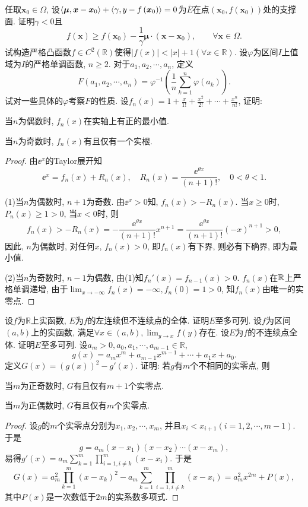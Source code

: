 \begin{quizb}
任取\(\boldsymbol{x}_0\in\varOmega\), 设\(\langle \boldsymbol{\mu},\boldsymbol{x}-\boldsymbol{x}_0 \rangle+\langle \gamma,y-f\left(\boldsymbol{x}_0\right) \rangle=0\)为\(\overline{E}\)在点\((\boldsymbol{x}_0,f\left(\boldsymbol{x}_0\right))\)处的支撑面. 证明\(\gamma<0\)且\[f\left(\boldsymbol{x}\right)\geqslant f\left(\boldsymbol{x}_0\right)-\frac{1}{\gamma}\boldsymbol{\mu}\cdot\left(\boldsymbol{x}-\boldsymbol{x}_0\right),\qquad\forall\boldsymbol{x}\in\varOmega.\]
\woe 试构造严格凸函数\(f\in C^2(\mathbb{R})\)使得\(\left|f(x)\right|<|x|+1\left(\forall x\in\mathbb{R}\right)\).
\woe 设\(\varphi\)为区间\(I\)上值域为\(I\)的严格单调函数, \(n\geqslant 2\). 对于\(a_1,a_2,\cdots,a_n\), 定义\[F(a_1,a_2,\cdots,a_n)=\varphi^{-1}\left(\frac{1}{n}\sum_{k=1}^{n}\varphi(a_k)\right).\]试对一些具体的\(\varphi\)考察\(F\)的性质.
\woe 设\(f_n(x)=1+\frac{x}{1!}+\frac{x^2}{2!}+\cdots+\frac{x^n}{n!}\), 证明:\begin{quizs}
\item 当\(n\)为偶数时, \(f_n(x)\)在实轴上有正的最小值.
\item 当\(n\)为奇数时, \(f_n(x)\)有且仅有一个实根.
\end{quizs}
\begin{proof}
由\(\ee^x\)的Taylor展开知\[\ee^x=f_n(x)+R_n(x),\quad R_n(x)=\frac{\ee^{\theta x}}{(n+1)!},\quad 0<\theta<1.\]

(1)当\(n\)为偶数时, \(n+1\)为奇数. 由\(\ee^x>0\)知, \(f_n(x)>-R_n(x)\). 当\(x\geqslant 0\)时, \(P_n(x)\geqslant 1>0\), 当\(x<0\)时, 则\[f_n(x)>-R_n(x)=-\frac{\ee^{\theta x}}{(n+1)!}x^{n+1}=\frac{\ee^{\theta x}}{(n+1)!}(-x)^{n+1}>0,\]因此, \(n\)为偶数时, 对任何\(x\), \(f_n(x)>0\), 即\(f_n(x)\)有下界, 则必有下确界, 即为最小值.

(2)当\(n\)为奇数时, \(n-1\)为偶数, 由(1)知\(f_n'(x)=f_{n-1}(x)>0\). \(f_n(x)\)在\(\mathbb{R}\)上严格单调递增, 由于\(\lim_{x\rightarrow-\infty}f_n(x)=-\infty,f_n(0)=1>0\), 知\(f_n(x)\)由唯一的实零点.
\end{proof}
\woe 设\(f\)为\(\mathbb{R}\)上实函数, \(E\)为\(f\)的左连续但不连续点的全体. 证明\(E\)至多可列.
\woe 设\(f\)为区间\((a,b)\)上的实函数, 满足\(\forall x\in(a,b),\lim_{y\rightarrow x}f(y)\)存在. 设\(E\)为\(f\)的不连续点全体. 证明\(E\)至多可列.
\woe 设\(a_m>0,a_0,a_1,\cdots,a_{m-1}\in\mathbb{R}\),\[g(x)=a_mx^m+a_{m-1}x^{m-1}+\cdots+a_1x+a_0.\]定义\(G(x)=\left(g(x)\right)^2-g'(x)\). 证明: 若\(g\)有\(m\)个不相同的实零点, 则\begin{quizs}
\item 当\(m\)为正奇数时, \(G\)有且仅有\(m+1\)个实零点.
\item 当\(m\)为正偶数时, \(G\)有且仅有\(m\)个实零点.
\end{quizs}
\begin{proof}
设\(g\)的\(m\)个实零点分别为\(x_1,x_2,\cdots,x_m\),  并且\(x_i<x_{i+1}(i=1,2,\cdots,m-1)\). 于是\[g=a_m(x-x_1)(x-x_2)\cdots(x-x_m),\]易得\(g'(x)=a_m\sum_{k=1}^{m}\prod_{i=1,i\ne k}^{m}(x-x_i)\). 于是\[G(x)=a_m^2\prod_{k=1}^{m}(x-x_k)^2-a_m\sum_{k=1}^{m}\prod_{i=1,i\ne k}^{m}(x-x_i)=a_m^2x^{2m}+P(x),\]其中\(P(x)\)是一次数低于\(2m\)的实系数多项式.


\end{proof}
\end{quizb}
